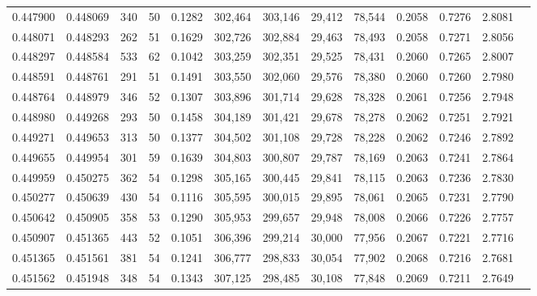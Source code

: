 \begin{tabular}{rrrrrrrrrrrrr}
0.447900 & 0.448069 &   340 &  50 &                                     0.1282 & 302,464 & 303,146 &  29,412 &  78,544 & 0.2058 & 0.7276 & 2.8081 \\
0.448071 & 0.448293 &   262 &  51 &                                     0.1629 & 302,726 & 302,884 &  29,463 &  78,493 & 0.2058 & 0.7271 & 2.8056 \\
0.448297 & 0.448584 &   533 &  62 &                                     0.1042 & 303,259 & 302,351 &  29,525 &  78,431 & 0.2060 & 0.7265 & 2.8007 \\
0.448591 & 0.448761 &   291 &  51 &                                     0.1491 & 303,550 & 302,060 &  29,576 &  78,380 & 0.2060 & 0.7260 & 2.7980 \\
0.448764 & 0.448979 &   346 &  52 &                                     0.1307 & 303,896 & 301,714 &  29,628 &  78,328 & 0.2061 & 0.7256 & 2.7948 \\
0.448980 & 0.449268 &   293 &  50 &                                     0.1458 & 304,189 & 301,421 &  29,678 &  78,278 & 0.2062 & 0.7251 & 2.7921 \\
0.449271 & 0.449653 &   313 &  50 &                                     0.1377 & 304,502 & 301,108 &  29,728 &  78,228 & 0.2062 & 0.7246 & 2.7892 \\
0.449655 & 0.449954 &   301 &  59 &                                     0.1639 & 304,803 & 300,807 &  29,787 &  78,169 & 0.2063 & 0.7241 & 2.7864 \\
0.449959 & 0.450275 &   362 &  54 &                                     0.1298 & 305,165 & 300,445 &  29,841 &  78,115 & 0.2063 & 0.7236 & 2.7830 \\
0.450277 & 0.450639 &   430 &  54 &                                     0.1116 & 305,595 & 300,015 &  29,895 &  78,061 & 0.2065 & 0.7231 & 2.7790 \\
0.450642 & 0.450905 &   358 &  53 &                                     0.1290 & 305,953 & 299,657 &  29,948 &  78,008 & 0.2066 & 0.7226 & 2.7757 \\
0.450907 & 0.451365 &   443 &  52 &                                     0.1051 & 306,396 & 299,214 &  30,000 &  77,956 & 0.2067 & 0.7221 & 2.7716 \\
0.451365 & 0.451561 &   381 &  54 &                                     0.1241 & 306,777 & 298,833 &  30,054 &  77,902 & 0.2068 & 0.7216 & 2.7681 \\
0.451562 & 0.451948 &   348 &  54 &                                     0.1343 & 307,125 & 298,485 &  30,108 &  77,848 & 0.2069 & 0.7211 & 2.7649 \\

\end{tabular}
